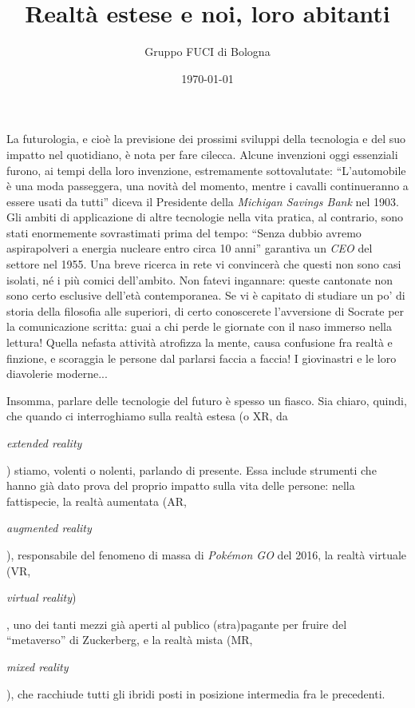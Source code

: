 \documentclass{article}
\title{Realtà estese e noi, loro abitanti}
\author{Gruppo FUCI di Bologna}
\date{\today}
\begin{document}
\maketitle
La futurologia, e cioè la previsione dei prossimi sviluppi della tecnologia e
del suo impatto nel quotidiano, è nota per fare cilecca. Alcune invenzioni oggi
essenziali furono, ai tempi della loro invenzione, estremamente sottovalutate:
``L'automobile è una moda passeggera, una novità del momento, mentre i cavalli
continueranno a essere usati da tutti'' diceva il Presidente della
\emph{Michigan Savings Bank} nel 1903. Gli ambiti di applicazione di altre
tecnologie nella vita pratica, al contrario, sono stati enormemente sovrastimati prima del tempo:
``Senza dubbio avremo aspirapolveri a energia nucleare entro circa 10 anni''
garantiva un \emph{CEO} del settore nel 1955. Una breve ricerca in rete vi
convincerà che questi non sono casi isolati, né i più comici dell'ambito. Non
fatevi ingannare: queste cantonate non sono certo esclusive dell'età
contemporanea. Se vi è capitato di studiare un po' di storia della filosofia
alle superiori, di certo conoscerete l'avversione di Socrate per la
comunicazione scritta: guai a chi perde le giornate con il naso immerso nella
lettura! Quella nefasta attività atrofizza la mente, causa confusione fra realtà
e finzione, e scoraggia le persone dal parlarsi faccia a faccia! I giovinastri e
le loro diavolerie moderne...

Insomma, parlare delle tecnologie del futuro è spesso un fiasco. Sia chiaro,
quindi, che quando ci interroghiamo sulla realtà estesa (o XR, da
\begin{otherlanguage}{american}\emph{extended reality}\end{otherlanguage})
stiamo, volenti o nolenti, parlando di presente. Essa include strumenti che
hanno già dato prova del proprio impatto sulla vita delle persone: nella
fattispecie, la realtà aumentata (AR,
\begin{otherlanguage}{american}\emph{augmented reality}\end{otherlanguage}),
responsabile del fenomeno di massa di \emph{Pokémon GO} del 2016, la realtà
virtuale (VR,
\begin{otherlanguage}{american}\emph{virtual reality})\end{otherlanguage}, uno
dei tanti mezzi già aperti al publico (stra)pagante per fruire del ``metaverso''
di Zuckerberg, e la realtà mista (MR, \begin{otherlanguage}{american}\emph{mixed
reality}\end{otherlanguage}), che racchiude tutti gli ibridi posti in posizione
intermedia fra le precedenti.
\end{document}
